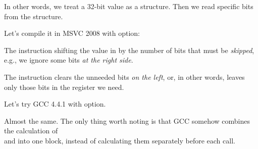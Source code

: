 In other words, we treat a 32-bit \Tint value as a structure.
Then we read specific bits from the structure.


Let's compile it in MSVC 2008 with \Ox option:




The  instruction shifting the value in \EAX by the number of bits that must be
\emph{skipped}, e.g., we ignore some bits \emph{at the right side}.


The \AND instruction clears the unneeded bits \emph{on the left}, or, in other words, 
leaves only those bits in the \EAX register we need.




Let's try GCC 4.4.1 with \Othree option.



Almost the same.
The only thing worth noting is that GCC somehow combines the calculation of\\
 and  into one block,
instead of calculating them separately before each \printf call.

